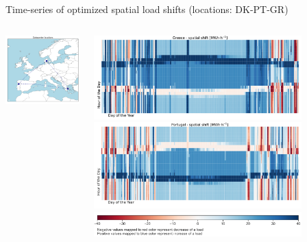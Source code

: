 \begin{frame}{Time-series of optimized spatial load shifts (locations: DK-PT-GR)}
	\centering
  
	\begin{columns}
	\begin{column}{7cm}
	\includegraphics[width=7cm]{images/results-9d.png}
	\end{column}
  
	\begin{column}{8cm}
	  \vspace{0.3cm}
	  \includegraphics[width=8cm]{images/results-9a.png}
	  \includegraphics[width=8cm]{images/results-9b.png}
	  \includegraphics[width=8cm]{images/results-9c.png}
	  \end{column}
	  \end{columns}
  
  \end{frame}
  
  
  

